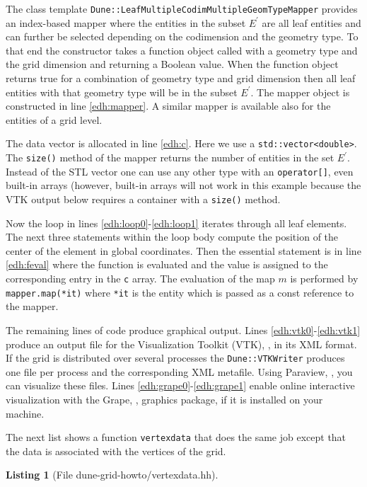 \documentclass[11pt,a4paper,headinclude,footinclude,DIV16,headings=normal]{scrreprt}
\newtheorem{lst}{Listing}
\begin{document}
The class template
\lstinline!Dune::LeafMultipleCodimMultipleGeomTypeMapper!  provides an
index-based mapper where the entities in the subset $E^\prime$ are all
leaf entities and can further be selected depending on the codimension
and the geometry type. To that end the constructor takes a function object
called with a geometry type and the grid dimension and returning a Boolean
value. When the function object returns true for a combination of geometry
type and grid dimension then all leaf entities with that geometry type
will be in the subset $E^\prime$. The mapper object is
constructed in line \ref{edh:mapper}. A similar mapper is available
also for the entities of a grid level.

The data vector is allocated in line \ref{edh:c}. Here we use a
\lstinline!std::vector<double>!. The \lstinline!size()! method of the
mapper returns the number of entities in the set $E^\prime$. Instead
of the STL vector one can use any other type with an
\lstinline!operator[]!, even built-in arrays (however, built-in arrays
will not work in this example because the VTK output
below requires a container with a
\lstinline!size()! method.

Now the loop in lines \ref{edh:loop0}-\ref{edh:loop1} iterates through
all leaf elements. The next three statements within the loop body
compute the position of the center of the element in global
coordinates. Then the essential statement is in line \ref{edh:feval}
where the function is evaluated and the value is assigned to the
corresponding entry in the \lstinline!c! array. The evaluation of the
map $m$ is performed by \lstinline!mapper.map(*it)!  where
\lstinline!*it! is the entity which is passed as a const reference to
the mapper.

The remaining lines of code produce graphical output. Lines
\ref{edh:vtk0}-\ref{edh:vtk1} produce an output file for the
Visualization Toolkit (VTK), \cite{VTK}, in its XML format. If the
grid is distributed over several processes the
\lstinline!Dune::VTKWriter! produces one file per process and the
corresponding XML metafile. Using Paraview, \cite{Paraview}, you can
visualize these files. Lines \ref{edh:grape0}-\ref{edh:grape1} enable
online interactive visualization with the Grape, \cite{Grape},
graphics package, if it is installed on your machine.

The next list shows a function \lstinline!vertexdata! that does the
same job except that the data is associated with the vertices of the
grid.

\begin{lst}[File dune-grid-howto/vertexdata.hh] \mbox{}
\nopagebreak

\end{lst}
\end{document}

